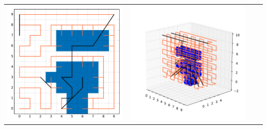 \documentclass{beamer}
\begin{document}
\begin{frame}
\begin{tabular}{rccc}
    \includegraphics[width=\fw]{2d_coverage_heur.pdf} &
    \includegraphics[width=\fw]{3d_coverage_heur.pdf}
  \end{tabular}

\end{frame}
\end{document}

